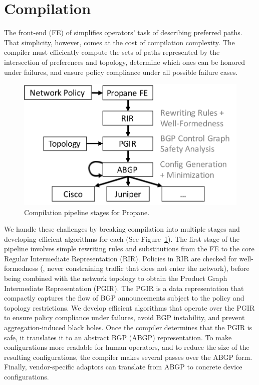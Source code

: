 \section{Compilation}
\label{sec:compilation}

The front-end (FE) of \sysname simplifies operators' task of describing preferred paths. That simplicity, however, comes at the cost of compilation complexity. The compiler must efficiently compute the sets of paths represented by the intersection of preferences and topology, determine which ones can be honored under failures, and ensure policy compliance under all possible failure cases.

\begin{figure}[t!]
  \centering
  \includegraphics[width=.75\columnwidth]{figures/pipeline}
  \caption{Compilation pipeline stages for Propane.}
  \label{fig:pipeline}
  \vspace{-1em}
\end{figure}

We handle these challenges by breaking compilation into multiple stages and developing efficient algorithms for each (See Figure~\ref{fig:pipeline}). The first stage of the pipeline involves simple rewriting rules and substitutions from the FE to the core Regular Intermediate Representation (RIR). Policies in RIR are checked for well-formedness (\EG, never constraining traffic that does not enter the network), before being combined with the network topology to obtain the Product Graph Intermediate Representation (PGIR). The PGIR is a data representation that compactly captures the flow of BGP announcements subject to the policy and topology restrictions. We develop efficient algorithms that operate over the PGIR to ensure policy compliance under failures, avoid BGP instability, and prevent aggregation-induced black holes. Once the compiler determines that the PGIR is safe, it translates it to an abstract BGP (ABGP) representation. To make configurations more readable for human operators, and to reduce the size of the resulting configurations, the \sysname compiler makes several passes over the ABGP form. Finally, vendor-specific adaptors can translate from ABGP to concrete device configurations.

